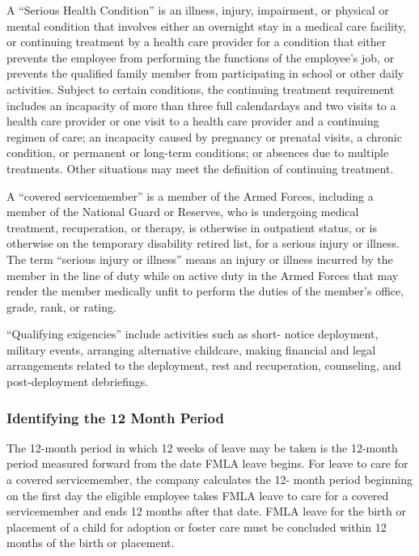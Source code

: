 A “Serious Health Condition” is an illness, injury, impairment, or physical or mental condition that involves either an overnight stay in a medical care facility, or continuing treatment by a health care provider for a condition that either prevents the employee from performing the functions of the employee's job, or prevents the qualified family member from participating in school or other daily activities. Subject to certain conditions, the continuing treatment requirement includes an incapacity of more than three full calendardays and two visits to a health care provider or one visit to a health care provider and a continuing regimen of care; an incapacity caused by pregnancy or prenatal visits, a chronic condition, or permanent or long-term conditions; or absences due to multiple treatments. Other situations may meet the definition of continuing treatment.

A “covered servicemember” is a member of the Armed Forces, including a member of the National Guard or Reserves, who is undergoing medical treatment, recuperation, or therapy, is otherwise in outpatient status, or is otherwise on the temporary disability retired list, for a serious injury or illness. The term “serious injury or illness” means an injury or illness incurred by the member in the line of duty while on active duty in the Armed Forces that may render the member medically unfit to perform the duties of the member's office, grade, rank, or rating.

“Qualifying exigencies” include activities such as short- notice deployment, military events, arranging alternative childcare, making financial and legal arrangements related to the deployment, rest and recuperation, counseling, and post-deployment debriefings.

\subsubsection{Identifying the 12 Month Period}

The 12-month period in which 12 weeks of leave may be taken is the 12-month period measured forward from the date FMLA leave begins. For leave to care for a covered servicemember, the company calculates the 12- month period beginning on the first day the eligible employee takes FMLA leave to care for a covered servicemember and ends 12 months after that date. FMLA leave for the birth or placement of a child for adoption or foster care must be concluded within 12 months of the birth or placement.

